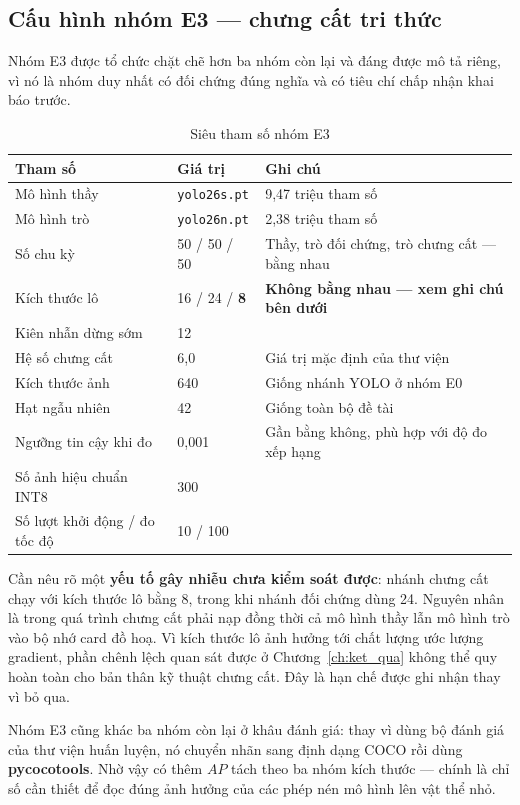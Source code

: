\subsection{Cấu hình nhóm E3 --- chưng cất tri thức}

Nhóm E3 được tổ chức chặt chẽ hơn ba nhóm còn lại và đáng được mô tả riêng, vì nó là nhóm duy nhất
có đối chứng đúng nghĩa và có tiêu chí chấp nhận khai báo trước.

\begin{table}[H]
\centering
\caption{Siêu tham số nhóm E3}
\label{tab:e3_cfg}
\small
\begin{tabular}{lll}
\toprule
\textbf{Tham số} & \textbf{Giá trị} & \textbf{Ghi chú} \\
\midrule
Mô hình thầy       & \texttt{yolo26s.pt} & 9,47 triệu tham số \\
Mô hình trò        & \texttt{yolo26n.pt} & 2,38 triệu tham số \\
Số chu kỳ          & 50 / 50 / 50 & Thầy, trò đối chứng, trò chưng cất --- bằng nhau \\
Kích thước lô      & 16 / 24 / \textbf{8} & \textbf{Không bằng nhau --- xem ghi chú bên dưới} \\
Kiên nhẫn dừng sớm & 12 & \\
Hệ số chưng cất    & 6,0 & Giá trị mặc định của thư viện \\
Kích thước ảnh     & 640 & Giống nhánh YOLO ở nhóm E0 \\
Hạt ngẫu nhiên     & 42 & Giống toàn bộ đề tài \\
Ngưỡng tin cậy khi đo & 0,001 & Gần bằng không, phù hợp với độ đo xếp hạng \\
Số ảnh hiệu chuẩn INT8 & 300 & \\
Số lượt khởi động / đo tốc độ & 10 / 100 & \\
\bottomrule
\end{tabular}
\end{table}

Cần nêu rõ một \textbf{yếu tố gây nhiễu chưa kiểm soát được}: nhánh chưng cất chạy với kích thước lô
bằng 8, trong khi nhánh đối chứng dùng 24. Nguyên nhân là trong quá trình chưng cất phải nạp đồng
thời cả mô hình thầy lẫn mô hình trò vào bộ nhớ card đồ hoạ. Vì kích thước lô ảnh hưởng tới chất
lượng ước lượng gradient, phần chênh lệch quan sát được ở Chương~\ref{ch:ket_qua} không thể quy hoàn
toàn cho bản thân kỹ thuật chưng cất. Đây là hạn chế được ghi nhận thay vì bỏ qua.

Nhóm E3 cũng khác ba nhóm còn lại ở khâu đánh giá: thay vì dùng bộ đánh giá của thư viện huấn luyện,
nó chuyển nhãn sang định dạng COCO rồi dùng \textbf{pycocotools}. Nhờ vậy có thêm $AP$ tách theo ba
nhóm kích thước --- chính là chỉ số cần thiết để đọc đúng ảnh hưởng của các phép nén mô hình lên
vật thể nhỏ.

